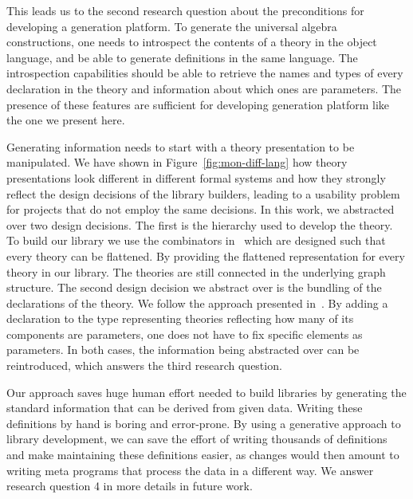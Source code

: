 This leads us to the second research question about the preconditions for developing a generation platform. To generate the universal algebra constructions, one needs to introspect the contents of a theory in the object language, and be able to generate definitions in the same language. The introspection capabilities should be able to retrieve the names and types of every declaration in the theory and information about which ones are parameters. The presence of these features are sufficient for developing generation platform like the one we present here. 

Generating information needs to start with a theory presentation to be manipulated. We have shown in Figure~\ref{fig:mon-diff-lang} how theory presentations look different in different formal systems and how they strongly reflect the design decisions of the library builders, leading to a usability problem for projects that do not employ the same decisions. In this work, we abstracted over two design decisions. The first is the hierarchy used to develop the theory. To build our library we use the combinators in~\cite{carette2018building} which are designed such that every theory can be flattened.  By providing the flattened representation for every theory in our library. The theories are still connected in the underlying graph structure. The second design decision we abstract over is the bundling of the declarations of the theory. We follow the approach presented in~\cite{alhassy2019}. By adding a declaration to the type representing theories reflecting how many of its components are parameters, one does not have to fix specific elements as parameters. In both cases, the information being abstracted over can be reintroduced, which answers the third research question.  

Our approach saves huge human effort needed to build libraries by generating the standard information that can be derived from given data. Writing these definitions by hand is boring and error-prone. By using a generative approach to library development, we can save the effort of writing thousands of definitions and make maintaining these definitions easier, as changes would then amount to writing meta programs that process the data in a different way. We answer research question 4 in more details in future work. 


